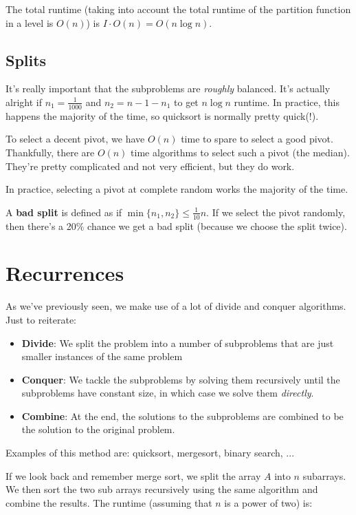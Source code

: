 \documentclass[11pt,a4paper,titlepage,dvipsnames,cmyk]{scrartcl}
\begin{document}
The total runtime (taking into account the total runtime of the partition
function in a level is $O(n)$) is $I \cdot O(n) = O(n \log n)$.

\subsection{Splits}%
\label{sub:Splits}
It's really important that the subproblems are \textit{roughly} balanced.
It's actually alright if $n_1 = \frac{1}{1000}$ and $n_2 = n - 1 - n_1$ to
get $n \log n$ runtime. In practice, this happens the majority of the
time, so quicksort is normally pretty quick(!).

To select a decent pivot, we have $O(n)$ time to spare to select a good
pivot. Thankfully, there are $O(n)$ time algorithms to select such a pivot
(the median). They're pretty complicated and not very efficient, but they
do work.

In practice, selecting a pivot at complete random works the majority of
the time.

A \textbf{bad split} is defined as if $\min\{n_1,n_2\} \le \frac{1}{10}n$.
If we select the pivot randomly, then there's a 20\% chance we get a bad
split (because we choose the split twice).

\section{Recurrences}%
\label{sec:Recurrences}
As we've previously seen, we make use of a lot of divide and conquer
algorithms. Just to reiterate:

\begin{itemize}
    \item \textbf{Divide}: We split the problem into a number of
        subproblems that are just smaller instances of the same problem
    \item \textbf{Conquer}: We tackle the subproblems by solving them
        recursively until the subproblems have constant size, in which
        case we solve them \textit{directly}.
    \item \textbf{Combine}: At the end, the solutions to the subproblems
        are combined to be the solution to the original problem.
\end{itemize}

Examples of this method are: quicksort, mergesort, binary search, ...

If we look back and remember merge sort, we split the array $A$ into $n$
subarrays. We then sort the two sub arrays recursively using the same
algorithm and combine the results. The runtime (assuming that $n$ is a
power of two) is:
\end{document}
